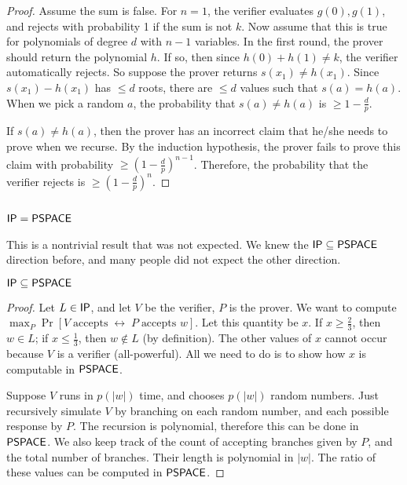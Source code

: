 \begin{proof}
\par Assume the sum is false. For $n=1$, the verifier evaluates $g(0), g(1)$, and rejects with probability 1 if the sum is not $k$. Now assume that this is true for polynomials of degree $d$ with $n-1$ variables. In the first round, the prover should return the polynomial $h$. If so, then since $h(0) + h(1) \ne k$, the verifier automatically rejects. So suppose the prover returns $s(x_1) \ne h(x_1)$. Since $s(x_1) - h(x_1)$ has $\le d$ roots, there are $\le d$ values such that $s(a) = h(a)$. When we pick a random $a$, the probability that $s(a) \ne h(a)$ is $\ge 1-\frac{d}{p}$. 

\par If $s(a) \ne h(a)$, then the prover has an incorrect claim that he/she needs to prove when we recurse. By the induction hypothesis, the prover fails to prove this claim with probability $\ge (1-\frac{d}{p})^{n-1}$. Therefore, the probability that the verifier rejects is $\ge (1-\frac{d}{p})^n$. 
\end{proof}



\subsection{${\mathsf{IP}} = {\mathsf{PSPACE}}$}
This is a nontrivial result that was not expected. We knew the ${\mathsf{IP}} \subseteq {\ensuremath{\mathsf{PSPACE}}}$ direction before, and many people did not expect the other direction. 
\begin{theorem}
${\mathsf{IP}} \subseteq {\ensuremath{\mathsf{PSPACE}}}$
\end{theorem}

\begin{proof}
Let $L \in {\ensuremath{\mathsf{IP}}}$, and let $V$ be the verifier, $P$ is the prover. We want to compute $\max_{P}\Pr[V\;\text{accepts}\;\leftrightarrow\;P\;\text{accepts $w$}]$. Let this quantity be $x$. If $x \ge \frac{2}{3}$, then $w \in L$; if $x \le \frac{1}{3}$, then $w \notin L$ (by definition). The other values of $x$ cannot occur because $V$ is a verifier (all-powerful). All we need to do is to show how $x$ is computable in ${\mathsf{PSPACE}}$.

\par Suppose $V$ runs in $p(|w|)$ time, and chooses $p(|w|)$ random numbers. Just recursively simulate $V$ by branching on each random number, and each possible response by $P$. The recursion is polynomial, therefore this can be done in ${\mathsf{PSPACE}}$. We also keep track of the count of accepting branches given by $P$, and the total number of branches. Their length is polynomial in $|w|$. The ratio of these values can be computed in ${\mathsf{PSPACE}}$.
\end{proof}

